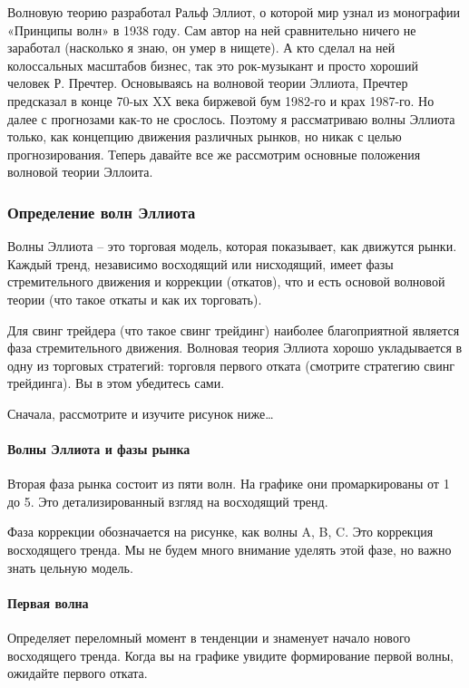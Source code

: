 \documentclass{book}
\begin{document}
Волновую теорию разработал Ральф Эллиот, о которой мир узнал из
монографии «Принципы волн» в 1938 году. Сам автор на ней сравнительно
ничего не заработал (насколько я знаю, он умер в нищете). А кто сделал
на ней колоссальных масштабов бизнес, так это рок-музыкант и просто
хороший человек Р. Пречтер. Основываясь на волновой теории Эллиота,
Пречтер предсказал в конце 70-ых XX века биржевой бум 1982-го и крах
1987-го. Но далее с прогнозами как-то не срослось. Поэтому я
рассматриваю волны Эллиота только, как концепцию движения различных
рынков, но никак с целью прогнозирования. Теперь давайте все же
рассмотрим основные положения волновой теории Эллоита.

\subsubsection{Определение волн Эллиота}

Волны Эллиота – это торговая модель, которая показывает, как движутся рынки. Каждый тренд, независимо восходящий или нисходящий, имеет фазы стремительного движения и коррекции (откатов), что и есть основой волновой теории (что такое откаты  и как их торговать).

Для свинг трейдера (что такое свинг трейдинг) наиболее благоприятной является фаза стремительного движения. Волновая теория Эллиота хорошо укладывается в одну из торговых стратегий: торговля первого отката (смотрите стратегию свинг трейдинга). Вы в этом убедитесь сами.

Сначала, рассмотрите и изучите рисунок ниже…

\paragraph{Волны Эллиота и фазы рынка}

Вторая фаза рынка состоит из пяти волн. На графике они промаркированы от 1 до 5. Это детализированный взгляд на восходящий тренд.

Фаза коррекции обозначается на рисунке, как волны A, B, C. Это
коррекция восходящего тренда. Мы не будем много внимание уделять этой
фазе, но важно знать цельную модель.

\paragraph{Первая волна}

Определяет переломный момент в тенденции и знаменует начало нового
восходящего тренда. Когда вы на графике увидите формирование первой
волны, ожидайте первого отката.
\end{document}
